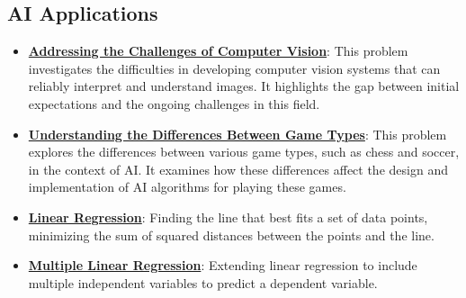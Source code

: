 \documentclass{article}%
\begin{document}
%
\subsection{AI Applications}%
\label{subsec:AIApplications}%
\begin{itemize}[leftmargin=*]%
\item \href{\url{https://purdue.brightspace.com/d2l/common/assets/pdfjs-d2l-dist/1.0.14-legacy/web/viewer.html?file=\%252Fcontent\%252Fenforced\%252F1095467-wl.202510.CS.24300.001\%252F02L2-Intro.pdf\%253Fou\%253D1095467\&lang=en-us\&container=d2l-fileviewer-rendered-pdf\&fullscreen=d2l-fileviewer-rendered-pdf-dialog\&height=667}#page=15}{\textbf{Addressing the Challenges of Computer Vision}}: This problem investigates the difficulties in developing computer vision systems that can reliably interpret and understand images. It highlights the gap between initial expectations and the ongoing challenges in this field.%
\item \href{\url{https://purdue.brightspace.com/d2l/common/assets/pdfjs-d2l-dist/1.0.14-legacy/web/viewer.html?file=\%252Fcontent\%252Fenforced\%252F1095467-wl.202510.CS.24300.001\%252F02L2-Intro.pdf\%253Fou\%253D1095467\&lang=en-us\&container=d2l-fileviewer-rendered-pdf\&fullscreen=d2l-fileviewer-rendered-pdf-dialog\&height=667}#page=27}{\textbf{Understanding the Differences Between Game Types}}: This problem explores the differences between various game types, such as chess and soccer, in the context of AI. It examines how these differences affect the design and implementation of AI algorithms for playing these games.%
\item \href{\url{https://purdue.brightspace.com/d2l/common/assets/pdfjs-d2l-dist/1.0.14-legacy/web/viewer.html?file=\%252Fcontent\%252Fenforced\%252F1095467-wl.202510.CS.24300.001\%252F05L2-ML\%20Basics.pdf\%253Fou\%253D1095467\&lang=en-us\&container=d2l-fileviewer-rendered-pdf\&fullscreen=d2l-fileviewer-rendered-pdf-dialog\&height=667}#page=6}{\textbf{Linear Regression}}: Finding the line that best fits a set of data points, minimizing the sum of squared distances between the points and the line.%
\item \href{\url{https://purdue.brightspace.com/d2l/common/assets/pdfjs-d2l-dist/1.0.14-legacy/web/viewer.html?file=\%252Fcontent\%252Fenforced\%252F1095467-wl.202510.CS.24300.001\%252F05L2-ML\%20Basics.pdf\%253Fou\%253D1095467\&lang=en-us\&container=d2l-fileviewer-rendered-pdf\&fullscreen=d2l-fileviewer-rendered-pdf-dialog\&height=667}#page=11}{\textbf{Multiple Linear Regression}}: Extending linear regression to include multiple independent variables to predict a dependent variable.%

\end{itemize}
\end{document}

